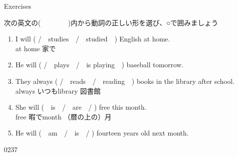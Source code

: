 \documentclass[aspectratio=169,xcolor={dvipsnames,table}]{beamer}
\newcommand{\myaudio}[1]{\href{#1}{\faVolumeUp}}
\begin{document}
\begin{frame}[plain]{Exercises}

{\small 次の英文の(~~~~~~~~)内から動詞の正しい形を選び、○で囲みましょう}

\begin{enumerate}
 \item I will (   /~~studies~~/~~studied~~) English at home.\\
\hfill{\scriptsize at home 家で}
 \item He will (  /~~plays~~/~~is playing~~) baseball tomorrow.
 \item They always (   /~~reads~~/~~reading~~) books in the library after school.\\
\hfill{\scriptsize always  いつも\hspace{12pt}library  図書館}
 \item She will (~~is~~/~~are~~/  ) free this month.\\
\hfill{\scriptsize free  暇で\hspace{12pt}month  （暦の上の）月}
 \item He will (~~am~~/~~is~~/  ) fourteen years old next month.
\end{enumerate}
\mbox{}\hfill{\tiny 0237}\,{\scriptsize \myaudio{./audio/012_will_03.mp3}} 
\end{frame}
\end{document}
